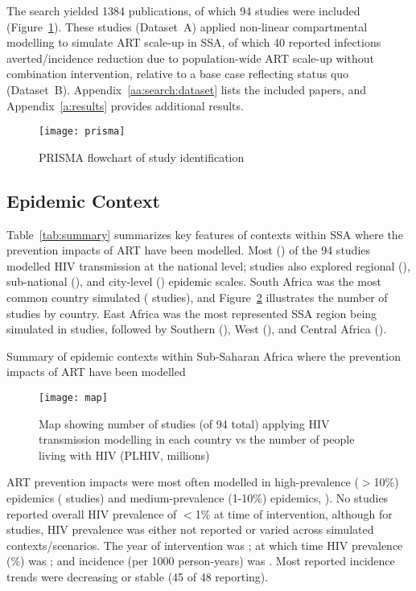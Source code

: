 The search yielded 1384 publications,
of which 94 studies were included (Figure~\ref{fig:prisma}).
These studies (Dataset~A) applied non-linear compartmental modelling to simulate ART scale-up in SSA,
of which 40 reported infections averted/incidence reduction
due to population-wide ART scale-up without combination intervention,
relative to a base case reflecting status quo (Dataset~B).
Appendix~\ref{aa:search:dataset} lists the included papers, and
Appendix~\ref{a:results} provides additional results.
\begin{figure}
  \centering
  \texttt{[image: prisma]}
  \caption{PRISMA flowchart of study identification}
  \label{fig:prisma}
\end{figure}
\subsection{Epidemic Context}
\label{ss:res:context}
Table~\ref{tab:summary} summarizes key features of contexts within SSA
where the prevention impacts of ART have been modelled.
Most () of the 94 studies modelled HIV transmission at the national level;
studies also explored
regional (),
sub-national (), and
city-level () epidemic scales.
South Africa was the most common country simulated ( studies), and
Figure~\ref{fig:map} illustrates the number of studies by country.
East Africa was the most represented SSA region being simulated in  studies,
followed by Southern (), West (), and Central Africa ().
\begin{table}
  \centering
  \caption{Summary of epidemic contexts within Sub-Saharan Africa where
    the prevention impacts of ART have been modelled}
  \label{tab:summary}
  
\end{table}
\begin{figure}
  \centering
  \texttt{[image: map]}
  \caption{Map showing number of studies (of 94 total)
    applying HIV transmission modelling in each country vs
    the number of people living with HIV (PLHIV, millions)}
  \label{fig:map}
\end{figure}
\par
ART prevention impacts were most often modelled in
high-prevalence ({$>$10\%}) epidemics ( studies) and
medium-prevalence ({1-10\%}) epidemics, ).
No studies reported overall HIV prevalence of {$<$1\%} at time of intervention,
although for  studies, HIV prevalence was either
not reported or varied across simulated contexts/scenarios.
The \xdmdef year of intervention was ; at which time
HIV prevalence (\%) was ; and
incidence (per 1000 person-years) was .
Most reported incidence trends were decreasing or stable (45 of 48 reporting). %
